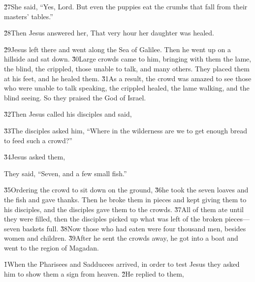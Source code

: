\v{27}She said, ``Yes, Lord. But even the puppies eat the crumbs that fall from their masters' tables.''

\v{28}Then Jesus answered her,  That very hour her daughter was healed.

\v{29}Jesus left there and went along the Sea of Galilee. Then he went up on a hillside and sat down. \v{30}Large crowds came to him, bringing with them the lame, the blind, the crippled, those unable to talk, and many others. They placed them at his feet, and he healed them. \v{31}As a result, the crowd was amazed to see those who were unable to talk speaking, the crippled healed, the lame walking, and the blind seeing. So they praised the God of Israel.

\v{32}Then Jesus called his disciples and said, 

\v{33}The disciples asked him, ``Where in the wilderness are we to get enough bread to feed such a crowd?''

\v{34}Jesus asked them, 

They said, ``Seven, and a few small fish.''

\v{35}Ordering the crowd to sit down on the ground, \v{36}he took the seven loaves and the fish and gave thanks. Then he broke them in pieces and kept giving them to his disciples, and the disciples gave them to the crowds. \v{37}All of them ate until they were filled, then the disciples picked up what was left of the broken pieces---seven baskets full. \v{38}Now those who had eaten were four thousand men, besides women and children. \v{39}After he sent the crowds away, he got into a boat and went to the region of Magadan.

\v{1}When the Pharisees and Sadducees arrived, in order to test Jesus they asked him to show them a sign from heaven. \v{2}He replied to them, 

